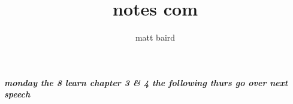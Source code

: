\documentclass[10pt,a4paper]{report}
\author{matt baird}
\title{notes com }
\begin{document}
\maketitle
\chapter{}
\chapter{}
\paragraph{monday the 8 learn chapter 3 \& 4 the following thurs go over next speech}

\section{}
\end{document}

